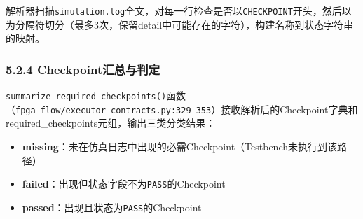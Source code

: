 \begin{Shaded}
\begin{Highlighting}[]
    \NormalTok{) }\OperatorTok{{-}\textgreater{}} \NormalTok{[}\NormalTok{, }\NormalTok{]:}
\NormalTok{[}\NormalTok{, }\NormalTok{] }\OperatorTok{=}\NormalTok{ \{\}}
\OperatorTok{=}
             
\OperatorTok{=}\StringTok{\textquotesingle{}|\textquotesingle{}}\NormalTok{, }\NormalTok{)}
             \OperatorTok{\textless{}} \NormalTok{:}
\OperatorTok{=}
\OperatorTok{=} \SpecialCharTok{\{}\SpecialCharTok{\}}\SpecialStringTok{|}\SpecialCharTok{\{}\SpecialCharTok{\}}\SpecialStringTok{\textquotesingle{}}
\end{Highlighting}
\end{Shaded}

解析器扫描\texttt{simulation.log}全文，对每一行检查是否以\texttt{CHECKPOINT\textbar{}}开头，然后以\texttt{\textbar{}}为分隔符切分（最多3次，保留detail中可能存在的\texttt{\textbar{}}字符），构建名称到状态字符串的映射。

\subsubsection{5.2.4
Checkpoint汇总与判定}\label{checkpointux6c47ux603bux4e0eux5224ux5b9a}

\texttt{summarize\_required\_checkpoints()}函数（\texttt{fpga\_flow/executor\_contracts.py:329-353}）接收解析后的Checkpoint字典和required\_checkpoints元组，输出三类分类结果：

\begin{itemize}
\tightlist
\item
  \textbf{missing}：未在仿真日志中出现的必需Checkpoint（Testbench未执行到该路径）
\item
  \textbf{failed}：出现但状态字段不为\texttt{PASS}的Checkpoint
\item
  \textbf{passed}：出现且状态为\texttt{PASS}的Checkpoint
\end{itemize}

